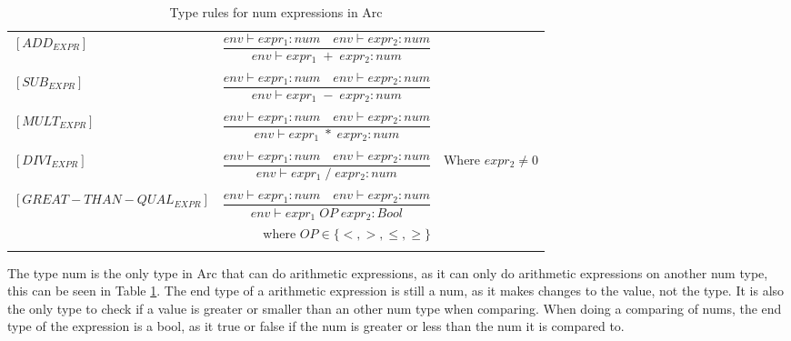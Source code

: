 \begin{table}[htb!]
    \centering
    \begin{tabular}{lr>{\raggedright\arraybackslash}p{6cm}}
        $[ADD_{EXPR}] $                         & $\dfrac
            {env\vdash expr_1: num \quad env\vdash expr_2: num}
            {env\vdash expr_1 \;+\;expr_2: num}$
        \\
        \\
        $[SUB_{EXPR}] $                         & $\dfrac
            {env\vdash expr_1: num \quad env\vdash expr_2: num}
            {env\vdash expr_1 \;-\;expr_2: num}$
        \\
        \\
        $[MULT_{EXPR}] $                        & $\dfrac
            {env\vdash expr_1: num \quad env\vdash expr_2: num}
            {env\vdash expr_1 \;*\;expr_2: num}$
        \\
        \\
        $[DIVI_{EXPR}] $                        & $\dfrac
            {env\vdash expr_1: num \quad env\vdash expr_2: num}
        {env\vdash expr_1 \; / \; expr_2: num}$ & Where $expr_2 \neq 0$
        \\
        \\
        $[GREAT-THAN-QUAL_{EXPR}] $             & $\dfrac
            {env\vdash expr_1: num \quad env\vdash expr_2: num}
            {env\vdash expr_1 \; OP \; expr_2: Bool}$                   \\ & where $OP \in \{<, >, \leq, \geq\}$

        \\
        \\
    \end{tabular}
    \caption{Type rules for num expressions in Arc}
    \label{tab:num-rules}
\end{table}

The type num is the only type in Arc that can do arithmetic expressions, as it can only do arithmetic expressions on another num type, this can be seen in Table \ref*{tab:num-rules}. The end type of a arithmetic expression is still a num, as it makes changes to the value, not the type. It is also the only type to check if a value is greater or smaller than an other num type when comparing. When doing a comparing of nums, the end type of the expression is a bool, as it true or false if the num is greater or less than the num it is compared to.

